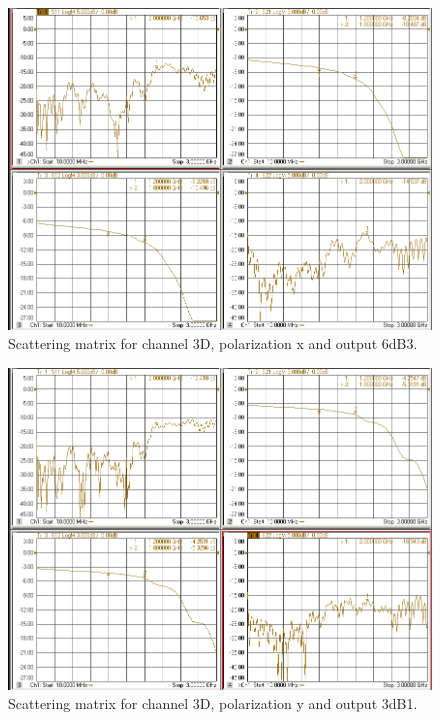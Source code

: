 \documentclass[12pt,a4paper,oneside]{article}
\begin{document}
\begin{figure}[H]
\centering
\includegraphics[width=0.9\linewidth]{VNA_results/3Dx_6dB3.png}
\caption{Scattering matrix for channel 3D, polarization x and output 6dB3.}
\label{fig:3Dx_6dB3}
\end{figure}


\begin{figure}[H]
\centering
\includegraphics[width=0.9\linewidth]{VNA_results/3Dy_3dB1.png}
\caption{Scattering matrix for channel 3D, polarization y and output 3dB1.}
\label{fig:3Dy_3dB1}
\end{figure}
\end{document}
